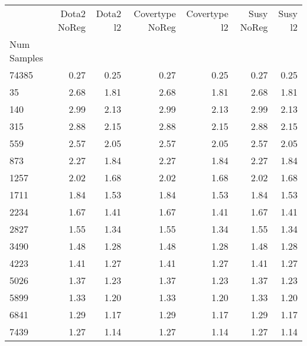 \begin{table}
\centering
\caption{}
\label{}
\begin{tabular}{lrrrrrr}
\toprule
{} &  Dota2 NoReg &  Dota2 l2 &  Covertype NoReg &  Covertype l2 &  Susy NoReg &  Susy l2 \\
Num Samples &              &           &                  &               &             &          \\
\midrule
74385       &         0.27 &      0.25 &             0.27 &          0.25 &        0.27 &     0.25 \\
35          &         2.68 &      1.81 &             2.68 &          1.81 &        2.68 &     1.81 \\
140         &         2.99 &      2.13 &             2.99 &          2.13 &        2.99 &     2.13 \\
315         &         2.88 &      2.15 &             2.88 &          2.15 &        2.88 &     2.15 \\
559         &         2.57 &      2.05 &             2.57 &          2.05 &        2.57 &     2.05 \\
873         &         2.27 &      1.84 &             2.27 &          1.84 &        2.27 &     1.84 \\
1257        &         2.02 &      1.68 &             2.02 &          1.68 &        2.02 &     1.68 \\
1711        &         1.84 &      1.53 &             1.84 &          1.53 &        1.84 &     1.53 \\
2234        &         1.67 &      1.41 &             1.67 &          1.41 &        1.67 &     1.41 \\
2827        &         1.55 &      1.34 &             1.55 &          1.34 &        1.55 &     1.34 \\
3490        &         1.48 &      1.28 &             1.48 &          1.28 &        1.48 &     1.28 \\
4223        &         1.41 &      1.27 &             1.41 &          1.27 &        1.41 &     1.27 \\
5026        &         1.37 &      1.23 &             1.37 &          1.23 &        1.37 &     1.23 \\
5899        &         1.33 &      1.20 &             1.33 &          1.20 &        1.33 &     1.20 \\
6841        &         1.29 &      1.17 &             1.29 &          1.17 &        1.29 &     1.17 \\
7439        &         1.27 &      1.14 &             1.27 &          1.14 &        1.27 &     1.14 \\
\bottomrule
\end{tabular}
\end{table}
